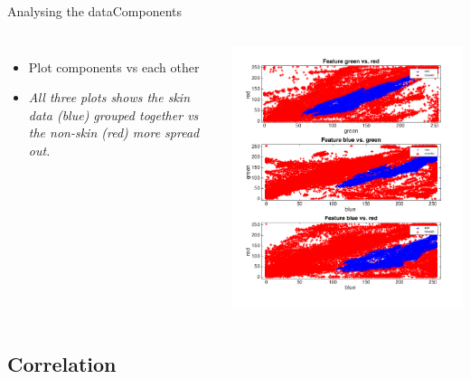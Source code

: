 \documentclass{beamer}
\begin{document}
\begin{frame}{Analysing the data}{Components}
    \begin{columns}
    \begin{itemize}
        \item Plot components vs each other
        \item \emph{All three plots shows the skin data (blue) grouped together vs the non-skin (red) more spread out. }
    \end{itemize}
        \includegraphics[scale=0.2]{components.png}
    \end{columns}
\end{frame}

\subsection{Correlation}
\end{document}
